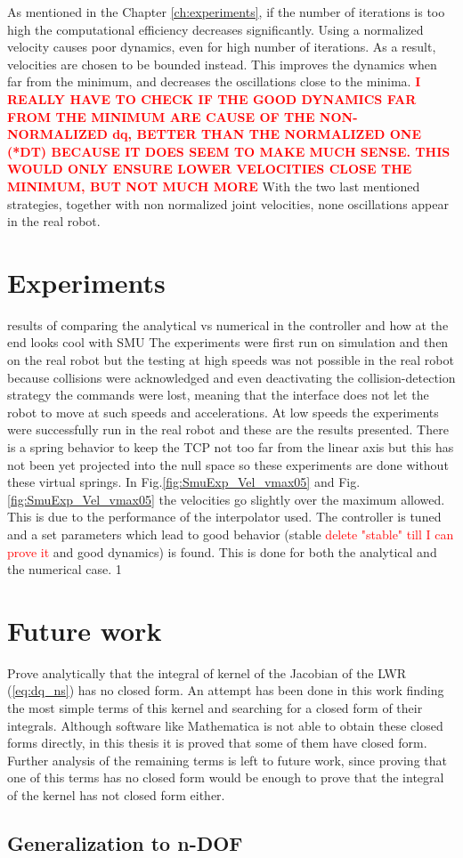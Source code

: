 {%
As mentioned in the Chapter \ref{ch:experiments}, if the number of iterations is too high the computational efficiency decreases significantly. Using a normalized velocity causes poor dynamics, even for high number of iterations.
As a result, velocities are chosen to be bounded instead. This improves the dynamics when far from the minimum, and decreases the oscillations close to the minima.
%
\textcolor{red}{\textbf{I REALLY HAVE TO CHECK IF THE GOOD DYNAMICS FAR FROM THE MINIMUM ARE CAUSE OF THE NON-NORMALIZED dq, BETTER THAN THE NORMALIZED ONE (*DT) BECAUSE IT DOES SEEM TO MAKE MUCH SENSE. THIS WOULD ONLY ENSURE LOWER VELOCITIES CLOSE THE MINIMUM, BUT NOT MUCH MORE}}
%
With the two last mentioned strategies, together with non normalized joint velocities, none oscillations appear in the real robot.
%
\section{Experiments}
results of comparing the analytical vs numerical in the controller and how at the end looks cool with SMU 
%
The experiments were first run on simulation and then on the real robot but the testing at high speeds was not possible in the real robot because collisions were acknowledged and even deactivating the collision-detection strategy the commands were lost, meaning that the interface does not let the robot to  move at such speeds and accelerations. At low speeds the experiments were successfully run in the real robot and these are the results presented.
%
There is a spring behavior to keep the TCP not too far from the linear axis but this has not been yet projected into the null space so these experiments are done without these virtual springs.
%
In Fig.\ref{fig:SmuExp_Vel_vmax05} and Fig.\ref{fig:SmuExp_Vel_vmax05} the velocities go slightly over the maximum allowed. This is due to the performance of the interpolator used.
%
The controller is tuned and a set parameters which lead to good behavior (stable\textcolor{red}{ delete "stable" till I can prove it} and good dynamics) is found. This is done for both the analytical and the numerical case. 
1}
\section{Future work}
\label{sec:future_work}

Prove analytically that the integral of kernel of the Jacobian of the LWR (\ref{eq:dq_ns}) has no closed form. An attempt has been done in this work finding the most simple terms of this kernel and searching for a closed form of their integrals. Although software like Mathematica is not able to obtain these closed forms directly, in this thesis it is proved that some of them have closed form. Further analysis of the remaining terms is left to future work, since proving that one of this terms has no closed form would be enough to prove that the integral of the kernel has not closed form either. 
\subsection{Generalization to n-DOF}
\label{subsec:extension_ndof}

